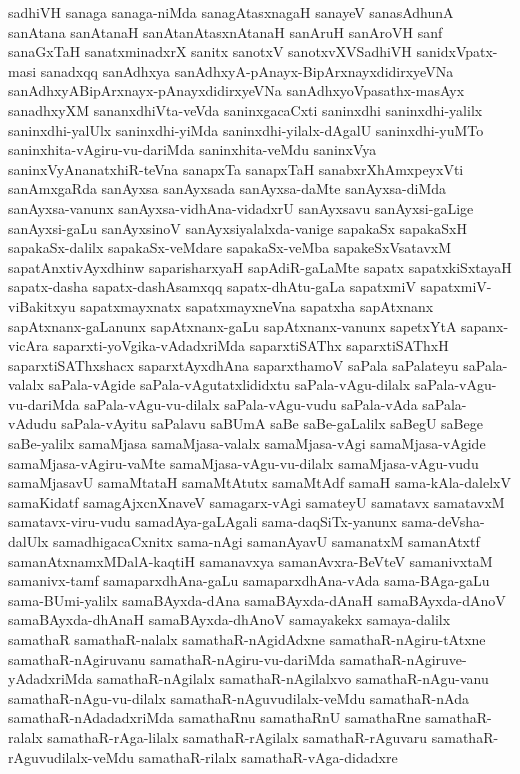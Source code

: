 {sadhiVH
sanaga
sanaga-niMda
sanagAtasxnagaH
sanayeV
sanasAdhunA
sanAtana
sanAtanaH
sanAtanAtasxnAtanaH
sanAruH
sanAroVH
sanf
sanaGxTaH
sanatxminadxrX
sanitx
sanotxV
sanotxvXVSadhiVH
sanidxVpatx-masi
sanadxqq
sanAdhxya
sanAdhxyA-pAnayx-BipArxnayxdidirxyeVNa
sanAdhxyABipArxnayx-pAnayxdidirxyeVNa
sanAdhxyoVpasathx-masAyx
sanadhxyXM
sananxdhiVta-veVda
saninxgacaCxti
saninxdhi
saninxdhi-yalilx
saninxdhi-yalUlx
saninxdhi-yiMda
saninxdhi-yilalx-dAgalU
saninxdhi-yuMTo
saninxhita-vAgiru-vu-dariMda
saninxhita-veMdu
saninxVya
saninxVyAnanatxhiR-teVna
sanapxTa
sanapxTaH
sanabxrXhAmxpeyxVti
sanAmxgaRda
sanAyxsa
sanAyxsada
sanAyxsa-daMte
sanAyxsa-diMda
sanAyxsa-vanunx
sanAyxsa-vidhAna-vidadxrU
sanAyxsavu
sanAyxsi-gaLige
sanAyxsi-gaLu
sanAyxsinoV
sanAyxsiyalalxda-vanige
sapakaSx
sapakaSxH
sapakaSx-dalilx
sapakaSx-veMdare
sapakaSx-veMba
sapakeSxVsatavxM
sapatAnxtivAyxdhinw
saparisharxyaH
sapAdiR-gaLaMte
sapatx
sapatxkiSxtayaH
sapatx-dasha
sapatx-dashAsamxqq
sapatx-dhAtu-gaLa
sapatxmiV
sapatxmiV-viBakitxyu
sapatxmayxnatx
sapatxmayxneVna
sapatxha
sapAtxnanx
sapAtxnanx-gaLanunx
sapAtxnanx-gaLu
sapAtxnanx-vanunx
sapetxYtA
sapanx-vicAra
saparxti-yoVgika-vAdadxriMda
saparxtiSAThx
saparxtiSAThxH
saparxtiSAThxshacx
saparxtAyxdhAna
saparxthamoV
saPala
saPalateyu
saPala-valalx
saPala-vAgide
saPala-vAgutatxlididxtu
saPala-vAgu-dilalx
saPala-vAgu-vu-dariMda
saPala-vAgu-vu-dilalx
saPala-vAgu-vudu
saPala-vAda
saPala-vAdudu
saPala-vAyitu
saPalavu
saBUmA
saBe
saBe-gaLalilx
saBegU
saBege
saBe-yalilx
samaMjasa
samaMjasa-valalx
samaMjasa-vAgi
samaMjasa-vAgide
samaMjasa-vAgiru-vaMte
samaMjasa-vAgu-vu-dilalx
samaMjasa-vAgu-vudu
samaMjasavU
samaMtataH
samaMtAtutx
samaMtAdf
samaH
sama-kAla-dalelxV
samaKidatf
samagAjxcnXnaveV
samagarx-vAgi
samateyU
samatavx
samatavxM
samatavx-viru-vudu
samadAya-gaLAgali
sama-daqSiTx-yanunx
sama-deVsha-dalUlx
samadhigacaCxnitx
sama-nAgi
samanAyavU
samanatxM
samanAtxtf
samanAtxnamxMDalA-kaqtiH
samanavxya
samanAvxra-BeVteV
samanivxtaM
samanivx-tamf
samaparxdhAna-gaLu
samaparxdhAna-vAda
sama-BAga-gaLu
sama-BUmi-yalilx
samaBAyxda-dAna
samaBAyxda-dAnaH
samaBAyxda-dAnoV
samaBAyxda-dhAnaH
samaBAyxda-dhAnoV
samayakekx
samaya-dalilx
samathaR
samathaR-nalalx
samathaR-nAgidAdxne
samathaR-nAgiru-tAtxne
samathaR-nAgiruvanu
samathaR-nAgiru-vu-dariMda
samathaR-nAgiruve-yAdadxriMda
samathaR-nAgilalx
samathaR-nAgilalxvo
samathaR-nAgu-vanu
samathaR-nAgu-vu-dilalx
samathaR-nAguvudilalx-veMdu
samathaR-nAda
samathaR-nAdadadxriMda
samathaRnu
samathaRnU
samathaRne
samathaR-ralalx
samathaR-rAga-lilalx
samathaR-rAgilalx
samathaR-rAguvaru
samathaR-rAguvudilalx-veMdu
samathaR-rilalx
samathaR-vAga-didadxre
}

